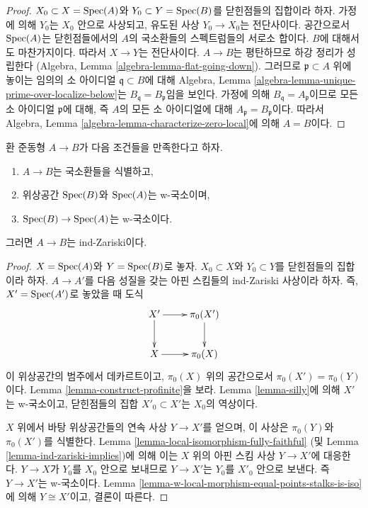 \begin{proof}
$X_0 \subset X = \mathop{\mathrm{Spec}}(A)$와 $Y_0 \subset Y = \mathop{\mathrm{Spec}}(B)$를
닫힌점들의 집합이라 하자. 가정에 의해 $Y_0$는 $X_0$ 안으로 사상되고,
유도된 사상 $Y_0 \to X_0$는 전단사이다.
공간으로서 $\mathop{\mathrm{Spec}}(A)$는 닫힌점들에서의 $A$의 국소환들의
스펙트럼들의 서로소 합이다. $B$에 대해서도 마찬가지이다.
따라서 $X \to Y$는 전단사이다. $A \to B$는 평탄하므로 하강 정리가 성립한다
(Algebra, Lemma \ref{algebra-lemma-flat-going-down}).
그러므로 $\mathfrak p \subset A$ 위에 놓이는 임의의 소 아이디얼
$\mathfrak q \subset B$에 대해 Algebra, Lemma
\ref{algebra-lemma-unique-prime-over-localize-below}는
$B_\mathfrak q = B_\mathfrak p$임을 보인다.
가정에 의해 $B_\mathfrak q = A_\mathfrak p$이므로 모든 소 아이디얼
$\mathfrak p$에 대해, 즉 $A$의 모든 소 아이디얼에 대해
$A_\mathfrak p = B_\mathfrak p$이다.
따라서 Algebra, Lemma \ref{algebra-lemma-characterize-zero-local}에 의해
$A = B$이다.
\end{proof}

\begin{lemma}
\label{lemma-w-local-morphism-equal-stalks-is-ind-zariski}
환 준동형 $A \to B$가 다음 조건들을 만족한다고 하자.
\begin{enumerate}
\item $A \to B$는 국소환들을 식별하고,
\item 위상공간 $\mathop{\mathrm{Spec}}(B)$와 $\mathop{\mathrm{Spec}}(A)$는 w-국소이며,
\item $\mathop{\mathrm{Spec}}(B) \to \mathop{\mathrm{Spec}}(A)$는 w-국소이다.
\end{enumerate}
그러면 $A \to B$는 ind-Zariski이다.
\end{lemma}

\begin{proof}
$X = \mathop{\mathrm{Spec}}(A)$와 $Y = \mathop{\mathrm{Spec}}(B)$로 놓자. $X_0 \subset X$와
$Y_0 \subset Y$를 닫힌점들의 집합이라 하자. $A \to A'$를 다음 성질을
갖는 아핀 스킴들의 ind-Zariski 사상이라 하자. 즉,
$X' = \mathop{\mathrm{Spec}}(A')$로 놓았을 때 도식
$$
\xymatrix{
X' \ar[r] \ar[d] & \pi_0(X') \ar[d] \\
X \ar[r] & \pi_0(X)
}
$$
이 위상공간의 범주에서 데카르트이고,
$\pi_0(X)$ 위의 공간으로서 $\pi_0(X') = \pi_0(Y)$이다.
Lemma \ref{lemma-construct-profinite}을 보라.
Lemma \ref{lemma-silly}에 의해 $X'$는 w-국소이고,
닫힌점들의 집합 $X'_0 \subset X'$는 $X_0$의 역상이다.

\medskip\noindent
$X$ 위에서 바탕 위상공간들의 연속 사상 $Y \to X'$를 얻으며,
이 사상은 $\pi_0(Y)$와 $\pi_0(X')$를 식별한다.
Lemma \ref{lemma-local-isomorphism-fully-faithful}
(및 Lemma \ref{lemma-ind-zariski-implies})에 의해 이는 $X$ 위의
아핀 스킴 사상 $Y \to X'$에 대응한다. $Y \to X$가 $Y_0$를
$X_0$ 안으로 보내므로 $Y \to X'$는 $Y_0$를 $X'_0$ 안으로 보낸다.
즉 $Y \to X'$는 w-국소이다. Lemma
\ref{lemma-w-local-morphism-equal-points-stalks-is-iso}에 의해
$Y \cong X'$이고, 결론이 따른다.
\end{proof}

